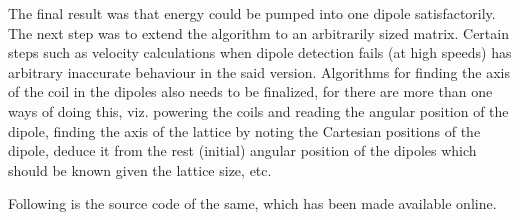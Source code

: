 		The final result was that energy could be pumped into one dipole satisfactorily. The next step was to extend the algorithm to an arbitrarily sized matrix. Certain steps such as velocity calculations when dipole detection fails (at high speeds) has arbitrary inaccurate behaviour in the said version. Algorithms for finding the axis of the coil in the dipoles also needs to be finalized, for there are more than one ways of doing this, viz. powering the coils and reading the angular position of the dipole, finding the axis of the lattice by noting the Cartesian positions of the dipole, deduce it from the rest (initial) angular position of the dipoles which should be known given the lattice size, etc.		
		\par
		Following is the source code of the same, which has been made available online.
		
